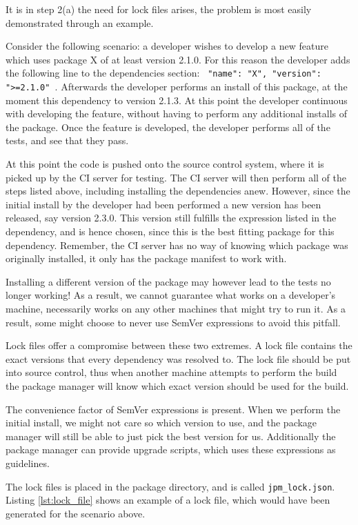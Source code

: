 It is in step 2(a) the need for lock files arises, the problem is most easily
demonstrated through an example.

Consider the following scenario: a developer wishes to develop a new feature
which uses package X of at least version 2.1.0. For this reason the developer
adds the following line to the dependencies section: \texttt{{
"name": "X", "version": ">=2.1.0" }}. Afterwards the developer performs an
install of this package, at the moment this dependency to version 2.1.3. At
this point the developer continuous with developing the feature, without
having to perform any additional installs of the package. Once the feature
is developed, the developer performs all of the tests, and see that they
pass.

At this point the code is pushed onto the source control system, where it is
picked up by the CI server for testing. The CI server will then perform all of
the steps listed above, including installing the dependencies anew. However,
since the initial install by the developer had been performed a new version
has been released, say version 2.3.0. This version still fulfills the
expression listed in the dependency, and is hence chosen, since this is the
best fitting package for this dependency. Remember, the CI server has no way
of knowing which package was originally installed, it only has the package
manifest to work with.

Installing a different version of the package may however lead to the tests no
longer working! As a result, we cannot guarantee what works on a developer's
machine, necessarily works on any other machines that might try to run it.
As a result, some might choose to never use SemVer expressions to avoid this
pitfall.

Lock files offer a compromise between these two extremes. A lock file contains
the exact versions that every dependency was resolved to. The lock file should
be put into source control, thus when another machine attempts to perform the
build the package manager will know which exact version should be used for the
build.

The convenience factor of SemVer expressions is present. When we perform the
initial install, we might not care so which version to use, and the package
manager will still be able to just pick the best version for us.  Additionally
the package manager can provide upgrade scripts, which uses these expressions
as guidelines.

The lock files is placed in the package directory, and is called
\verb!jpm_lock.json!. Listing \ref{lst:lock_file} shows an example of a lock
file, which would have been generated for the scenario above.

